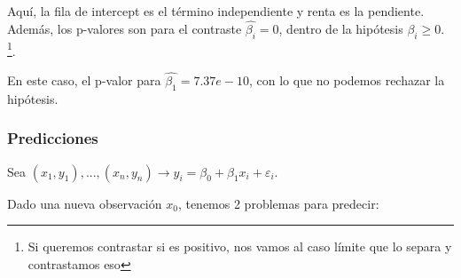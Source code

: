 \documentclass[palatino,nochap]{apuntes}
\begin{document}
Aquí, la fila de intercept es el término independiente y renta es la pendiente. Además, los p-valores son para el contraste $\hat{β_i} = 0$, dentro de la hipótesis $β_i \geq 0$. \footnote{Si queremos contrastar si es positivo, nos vamos al caso límite que lo separa y contrastamos eso}.

En este caso, el p-valor para $\hat{β_1} = 7.37e-10$, con lo que no podemos rechazar la hipótesis.


\subsubsection{Predicciones}

Sea $(x_1,y_1),...,(x_n,y_n) \to y_i = β_0 + β_1x_i + ε_i$.

Dado una nueva observación $x_0$, tenemos 2 problemas para predecir:
\end{document}
